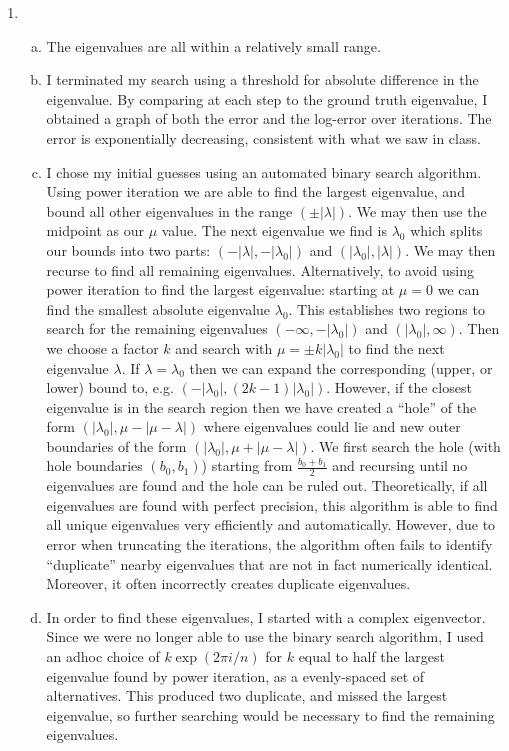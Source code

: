 \documentclass[letter, 12pt]{article}
\begin{document}
\begin{enumerate}
	\item 
	\begin{enumerate}[(a)]
	\item The eigenvalues are all within a relatively small range.
	\item I terminated my search using a threshold for absolute difference in the eigenvalue. By comparing at each step to the ground truth eigenvalue, I obtained a graph of both the error and the log-error over iterations. The error is exponentially decreasing, consistent with what we saw in class.
	\item I chose my initial guesses using an automated binary search algorithm. Using power iteration we are able to find the largest eigenvalue, and bound all other eigenvalues in the range $(\pm|\lambda|)$. We may then use the midpoint as our $\mu$ value. The next eigenvalue we find is $\lambda_0$ which splits our bounds into two parts: $(-|\lambda|,-|\lambda_0|)$ and $(|\lambda_0|,|\lambda|)$. We may then recurse to find all remaining eigenvalues. Alternatively, to avoid using power iteration to find the largest eigenvalue: starting at $\mu = 0$ we can find the smallest absolute eigenvalue $\lambda_0$. This establishes two regions to search for the remaining eigenvalues $(-\infty,-|\lambda_0|)$ and $(|\lambda_0|,\infty)$. Then we choose a factor $k$ and search with $\mu = \pm k|\lambda_0|$ to find the next eigenvalue $\lambda$. If $\lambda = \lambda_0$ then we can expand the corresponding (upper, or lower) bound to, e.g. $(-|\lambda_0|, (2k-1)|\lambda_0|)$. However, if the closest eigenvalue is in the search region then we have created a ``hole'' of the form $(|\lambda_0|,\mu - |\mu-\lambda|)$ where eigenvalues could lie and new outer boundaries of the form $(|\lambda_0|,\mu + |\mu-\lambda|)$. We first search the hole (with hole boundaries $(b_0,b_1)$) starting from $\frac{b_0+b_1}{2}$ and recursing until no eigenvalues are found and the hole can be ruled out. Theoretically, if all eigenvalues are found with perfect precision, this algorithm is able to find all unique eigenvalues very efficiently and automatically. However, due to error when truncating the iterations, the algorithm often fails to identify ``duplicate'' nearby eigenvalues that are not in fact numerically identical. Moreover, it often incorrectly creates duplicate eigenvalues. 
	\item In order to find these eigenvalues, I started with a complex eigenvector. Since we were no longer able to use the binary search algorithm, I used an adhoc choice of $k\exp(2\pi i/n)$ for $k$ equal to half the largest eigenvalue found by power iteration, as a evenly-spaced set of alternatives. This produced two duplicate, and missed the largest eigenvalue, so further searching would be necessary to find the remaining eigenvalues.
	\end{enumerate}


\end{enumerate}
\end{document}
